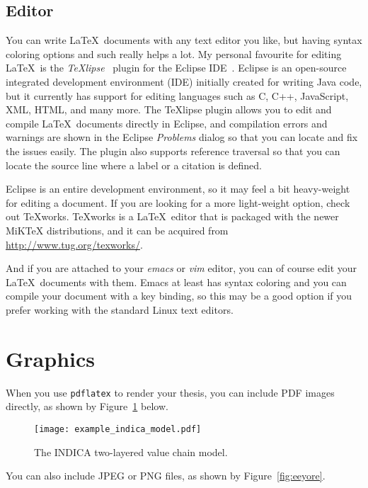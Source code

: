 \documentclass[12pt,a4paper,oneside,pdftex]{report}
\begin{document}
\subsection{Editor}

You can write \LaTeX\ documents with any text editor you like, but having
syntax coloring options and such really helps a lot.
My personal favourite for editing \LaTeX\ is the
\emph{TeXlipse}~\cite{TeXlipse} plugin for the Eclipse IDE~\cite{Eclipse}.
Eclipse is an open-source integrated development environment (IDE) initially
created for writing Java code, but it currently has support for editing
languages such as C, C++, JavaScript, XML, HTML, and many more.
The TeXlipse plugin allows you to edit and compile \LaTeX\ documents directly
in Eclipse, and compilation errors and warnings are shown in the Eclipse
\emph{Problems} dialog so that you can locate and fix the issues easily.
The plugin also supports reference traversal so that you can locate the source
line where a label or a citation is defined.

Eclipse is an entire development environment, so it may feel a bit heavy-weight
for editing a document.
If you are looking for a more light-weight option, check out TeXworks.
TeXworks is a \LaTeX\ editor that is packaged with the newer MiKTeX
distributions, and it can be acquired from \url{http://www.tug.org/texworks/}.

And if you are attached to your \emph{emacs} or \emph{vim} editor, you
can of course edit your \LaTeX\ documents with them.
Emacs at least has syntax coloring and you can compile your document with a key
binding, so this may be a good option if you prefer working with the standard
Linux text editors.

\section{Graphics}

When you use \texttt{pdflatex} to render your thesis, you can include PDF images
directly, as shown by Figure~\ref{fig:indica_model} below.

\begin{figure}[ht]
  \begin{center}
    \texttt{[image: example\_indica\_model.pdf]}
    \caption{The INDICA two-layered value chain model.}
    \label{fig:indica_model}
  \end{center}
\end{figure}

You can also include JPEG or PNG files, as shown by Figure~\ref{fig:eeyore}.
\end{document}
